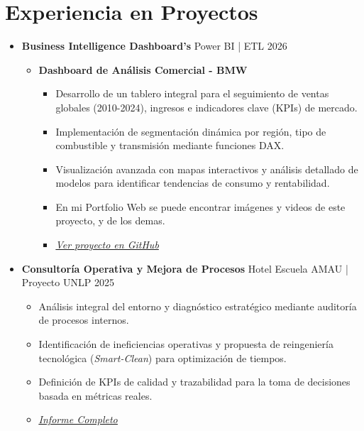 \documentclass[11pt, a4paper]{article}
\newcommand{\projectHeader}[3]{
    \textbf{#1} \hfill {\footnotesize \color{accent} #2 \textbar{} #3}
}
\begin{document}
\section*{Experiencia en Proyectos}

\begin{itemize}[leftmargin=*]

    \item \projectHeader{Business Intelligence Dashboard's}{Power BI | ETL}{2026}
    \vspace{3pt}
    \begin{itemize}[label=\textbullet]
        \item \textbf{Dashboard de Análisis Comercial - BMW}
        \begin{itemize}[label=--] %
            \item Desarrollo de un tablero integral para el seguimiento de ventas globales (2010-2024), ingresos e indicadores clave (KPIs) de mercado.
            \item Implementación de segmentación dinámica por región, tipo de combustible y transmisión mediante funciones DAX.
            \item Visualización avanzada con mapas interactivos y análisis detallado de modelos para identificar tendencias de consumo y rentabilidad.
            \item En mi Portfolio Web se puede encontrar imágenes y videos de este proyecto, y de los demas.
            \item \href{https://github.com/JoacoLucen/BMW-Sales-Analysis-Power-BI}{\faGithub{} \textit{Ver proyecto en GitHub}}
        \end{itemize}
    \end{itemize}
    \vspace{4pt}

    \item \projectHeader{Consultoría Operativa y Mejora de Procesos}{Hotel Escuela AMAU | Proyecto UNLP}{2025}
    \begin{itemize}[label=\textbullet]
        \item Análisis integral del entorno y diagnóstico estratégico mediante auditoría de procesos internos.
        \item Identificación de ineficiencias operativas y propuesta de reingeniería tecnológica (\textit{Smart-Clean}) para optimización de tiempos.
        \item Definición de KPIs de calidad y trazabilidad para la toma de decisiones basada en métricas reales.
    \item \href{https://drive.google.com/file/d/1wdzdxoutsG3LJ89Nxbsgm8bPV1dETKXE/view?usp=sharing}{\faFilePdfO{} \textit{\underline{Informe Completo}}}
    \end{itemize}
    \vspace{4pt}


\end{itemize}
\end{document}
